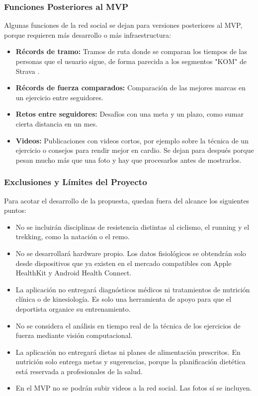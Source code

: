 \subsubsection*{Funciones Posteriores al MVP}
Algunas funciones de la red social se dejan para versiones posteriores al MVP, porque requieren más desarrollo o más infraestructura:
\begin{itemize}
    \item \textbf{Récords de tramo:} Tramos de ruta donde se comparan los tiempos de las personas que el usuario sigue, de forma parecida a los segmentos "KOM" de Strava \citep{strava_segments}.
    \item \textbf{Récords de fuerza comparados:} Comparación de las mejores marcas en un ejercicio entre seguidores.
    \item \textbf{Retos entre seguidores:} Desafíos con una meta y un plazo, como sumar cierta distancia en un mes.
    \item \textbf{Videos:} Publicaciones con videos cortos, por ejemplo sobre la técnica de un ejercicio o consejos para rendir mejor en cardio. Se dejan para después porque pesan mucho más que una foto y hay que procesarlos antes de mostrarlos.
\end{itemize}
\subsubsection*{Exclusiones y Límites del Proyecto}
Para acotar el desarrollo de la propuesta, quedan fuera del alcance los siguientes puntos:
\begin{itemize}
    \item No se incluirán disciplinas de resistencia distintas al ciclismo, el running y el trekking, como la natación o el remo.
    \item No se desarrollará hardware propio. Los datos fisiológicos se obtendrán solo desde dispositivos que ya existen en el mercado compatibles con Apple HealthKit y Android Health Connect.
    \item La aplicación no entregará diagnósticos médicos ni tratamientos de nutrición clínica o de kinesiología. Es solo una herramienta de apoyo para que el deportista organice su entrenamiento.
    \item No se considera el análisis en tiempo real de la técnica de los ejercicios de fuerza mediante visión computacional.
    \item La aplicación no entregará dietas ni planes de alimentación prescritos. En nutrición solo entrega metas y sugerencias, porque la planificación dietética está reservada a profesionales de la salud.
    \item En el MVP no se podrán subir videos a la red social. Las fotos sí se incluyen.
\end{itemize}
\newpage
